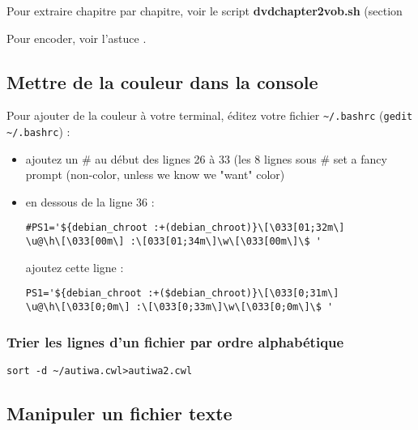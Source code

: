 \documentclass[a4paper,twoside]{article}
\begin{document}
Pour extraire chapitre par chapitre, voir le script \textbf{dvdchapter2vob.sh} (section 

Pour encoder, voir l'astuce .

\subsection{Mettre de la couleur dans la console}
Pour ajouter de la couleur à votre terminal, éditez votre fichier \verb|~/.bashrc| (\verb|gedit ~/.bashrc|) :
\begin{itemize}
\item ajoutez un \# au début des lignes 26 à 33 (les 8 lignes sous \# set a fancy prompt (non-color, unless we know we "want" color)
\item en dessous de la ligne 36 :

\begin{verbatim}
#PS1='${debian_chroot :+(debian_chroot)}\[\033[01;32m\]
\u@\h\[\033[00m\] :\[033[01;34m\]\w\[\033[00m\]\$ '\end{verbatim}

ajoutez cette ligne :

\begin{verbatim}
PS1='${debian_chroot :+($debian_chroot)}\[\033[0;31m\]
\u@\h\[\033[0;0m\] :\[\033[0;33m\]\w\[\033[0;0m\]\$ '
\end{verbatim}
\end{itemize}

\subsubsection{Trier les lignes d'un fichier par ordre alphabétique}

\begin{verbatim}
sort -d ~/autiwa.cwl>autiwa2.cwl
\end{verbatim}


\subsection{Manipuler un fichier texte}
\end{document}
